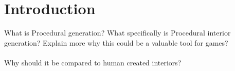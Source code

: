 \section{Introduction}

What is Procedural generation? 
What specifically is Procedural interior generation?
Explain more why this could be a valuable tool for games?
\\
\\
Why should it be compared to human created interiors?
